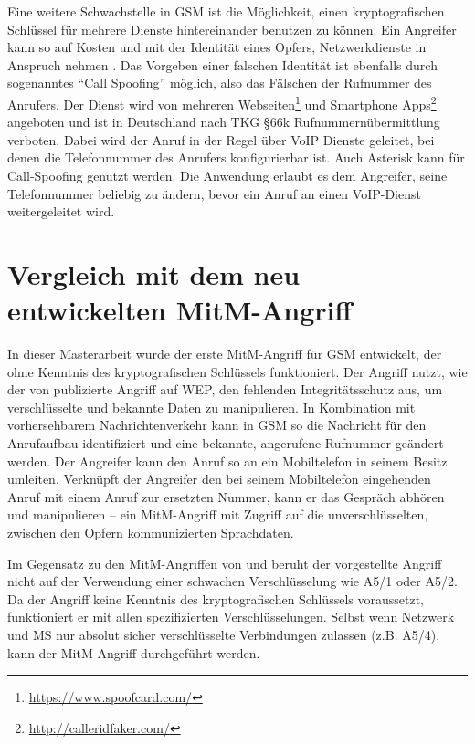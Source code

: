 Eine weitere Schwachstelle in \ac{GSM} ist die Möglichkeit, einen kryptografischen Schlüssel für mehrere Dienste hintereinander benutzen zu können. Ein Angreifer kann so auf Kosten und mit der Identität eines Opfers, Netzwerkdienste in Anspruch nehmen \citep{gsmmap:secrep-ger}. Das Vorgeben einer falschen Identität ist ebenfalls durch sogenanntes "`Call Spoofing"' möglich, also das Fälschen der Rufnummer des Anrufers. Der Dienst wird von mehreren Webseiten\footnote{\url{https://www.spoofcard.com/}} und Smartphone Apps\footnote{\url{http://calleridfaker.com/}} angeboten und ist in Deutschland nach \ac{TKG} §66k Rufnummernübermittlung verboten. Dabei wird der Anruf in der Regel über \ac{VoIP} Dienste geleitet, bei denen die Telefonnummer des Anrufers konfigurierbar ist. Auch Asterisk kann für Call-Spoofing genutzt werden. Die Anwendung erlaubt es dem Angreifer, seine Telefonnummer beliebig zu ändern, bevor ein Anruf an einen \ac{VoIP}-Dienst weitergeleitet wird.

\section{Vergleich mit dem neu entwickelten MitM-Angriff}

In dieser Masterarbeit wurde der erste \ac{MitM}-Angriff für \ac{GSM} entwickelt, der ohne Kenntnis des kryptografischen Schlüssels funktioniert. Der Angriff nutzt, wie der von \citet{bittau2006final} publizierte Angriff auf \ac{WEP}, den fehlenden Integritätsschutz aus, um verschlüsselte und bekannte Daten zu manipulieren. In Kombination mit vorhersehbarem Nachrichtenverkehr kann in \ac{GSM} so die Nachricht für den Anrufaufbau identifiziert und eine bekannte, angerufene Rufnummer geändert werden. Der Angreifer kann den Anruf so an ein Mobiltelefon in seinem Besitz umleiten. Verknüpft der Angreifer den bei seinem Mobiltelefon eingehenden Anruf mit einem Anruf zur ersetzten Nummer, kann er das Gespräch abhören und manipulieren -- ein \ac{MitM}-Angriff mit Zugriff auf die unverschlüsselten, zwischen den Opfern kommunizierten Sprachdaten.

Im Gegensatz zu den \ac{MitM}-Angriffen von \citet{barkan2003instant} und \citet{meyer2004man} beruht der vorgestellte Angriff nicht auf der Verwendung einer schwachen Verschlüsselung wie A5/1 oder A5/2. Da der Angriff keine Kenntnis des kryptografischen Schlüssels voraussetzt, funktioniert er mit allen spezifizierten Verschlüsselungen. Selbst wenn Netzwerk und \ac{MS} nur absolut sicher verschlüsselte Verbindungen zulassen (z.B. A5/4), kann der \ac{MitM}-Angriff durchgeführt werden. 

